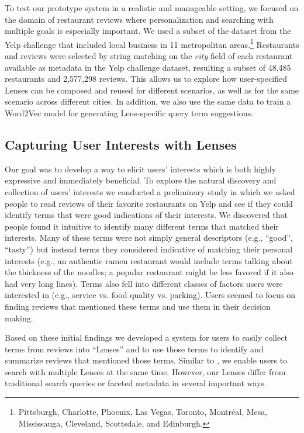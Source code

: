 To test our prototype system in a realistic and manageable setting, we focused on the domain of restaurant reviews where personalization and searching with multiple goals is especially important. We used a subset of the dataset from the Yelp challenge \cite{yelpdata} that included local business in 11 metropolitan areas.\footnote{Pittsburgh, Charlotte, Phoenix, Las Vegas, Toronto, Montréal, Mesa, Mississauga, Cleveland, Scottsdale, and Edinburgh.} Restaurants and reviews were selected by string matching on the \emph{city} field of each restaurant available as metadata in the Yelp challenge dataset, resulting a subset of 48,485 restaurants and 2,577,298 reviews. This allows us to explore how user-specified Lenses can be composed and reused for different scenarios, as well as for the same scenario across different cities. In addition, we also use the same data to train a Word2Vec model \cite{mikolov2013efficient} for generating Lens-specific query term suggestions.


\subsection{Capturing User Interests with Lenses}

Our goal was to develop a way to elicit users' interests which is both highly expressive and immediately beneficial. To explore the natural discovery and collection of users' interests we conducted a preliminary study in which we asked people to read reviews of their favorite restaurants on Yelp and see if they could identify terms that were good indications of their interests. We discovered that people found it intuitive to identify many different terms that matched their interests. Many of these terms were not simply general descriptors (e.g., ``good'', ``tasty'') but instead terms they considered indicative of matching their personal interests (e.g., an authentic ramen restaurant would include terms talking about the thickness of the noodles; a popular restaurant might be less favored if it also had very long lines). Terms also fell into different classes of factors users were interested in (e.g., service vs. food quality vs. parking). Users seemed to focus on finding reviews that mentioned these terms and use them in their decision making.

Based on these initial findings we developed a system for users to easily collect terms from reviews into ``Lenses'' and to use those terms to identify and summarize reviews that mentioned those terms. Similar to \cite{hearst1996visualizing}, we enable users to search with multiple Lenses at the same time. However, our Lenses differ from traditional search queries or faceted metadata in several important ways. 

